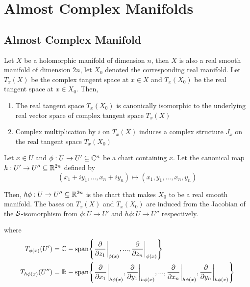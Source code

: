 \chapter{Almost Complex Manifolds}

\section{Almost Complex Manifold}

\begin{proposition}
	Let $X$ be a holomorphic manifold of dimension $n$, then $X$ is also a real smooth manifold of dimension $2n$, let $X_0$ denoted the corresponding real manifold. Let $T_x(X)$ be the complex tangent space at $x \in X$ and $T_x(X_0)$ be the real tangent space at $x \in X_0$. Then,
	\begin{enumerate}
		\item The real tangent space $T_x(X_0)$ is canonically isomorphic to the underlying real vector space of complex tangent space $T_x(X)$
		
		\item Complex multiplication by $i$ on $T_x(X)$ induces a complex structure $J_x$ on the real tangent space $T_x(X_0)$
	\end{enumerate}
	\begin{longproof}
		Let $x \in U$ and $\phi: U \to U' \subseteq \mathbb{C}^n$ be a chart containing $x$. Let the canonical map $h: U' \to U'' \subseteq \mathbb{R}^{2n}$ defined by
		$$
		(x_1 + i y_1, ..., x_n + i y_n) \mapsto (x_1, y_1, ..., x_n, y_n)
		$$
		
		Then, $h \phi: U \to U'' \subseteq \mathbb{R}^{2n}$ is the chart that makes $X_0$ to be a real smooth manifold. The bases on $T_x(X)$ and $T_x(X_0)$ are induced from the Jacobian of the $\mathcal{S}$-isomorphism from $\phi: U \to U'$ and $h \phi: U \to U''$ respectively.
		\begin{center}
		\end{center}
		
		where 
		\begin{align*}
			T_{\phi(x)}(U') &= \C-\Span\set*{\frac{\partial}{\partial z_1}\bigg\vert_{\phi(x)}, ..., \frac{\partial}{\partial z_n}\bigg\vert_{\phi(x)}} \\
			T_{h \phi(x)}(U'') &= \R-\Span\set*{\frac{\partial}{\partial x_1}\bigg\vert_{h \phi(x)}, \frac{\partial}{\partial y_1}\bigg\vert_{h \phi(x)}, ..., \frac{\partial}{\partial x_n}\bigg\vert_{h \phi(x)}, \frac{\partial}{\partial y_n}\bigg\vert_{h \phi(x)}}
		\end{align*}
		

\end{longproof}
\end{proposition}
